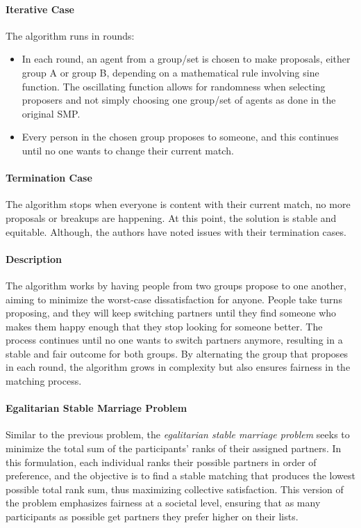 \paragraph{Iterative Case}
The algorithm runs in rounds:
\begin{itemize}
    \item In each round, an agent from a group/set is chosen to make proposals, either group A or group B, depending on a mathematical rule involving sine function. The oscillating function allows for randomness when selecting proposers and not simply choosing one group/set of agents as done in the original SMP.
    \item Every person in the chosen group proposes to someone, and this continues until no one wants to change their current match.
\end{itemize}

\paragraph{Termination Case}
The algorithm stops when everyone is content with their current match, no more proposals or breakups are happening. At this point, the solution is stable and equitable. Although, the authors have noted issues with their termination cases.

\paragraph{Description}
The algorithm works by having people from two groups propose to one another, aiming to minimize the worst-case dissatisfaction for anyone. People take turns proposing, and they will keep switching partners until they find someone who makes them happy enough that they stop looking for someone better. The process continues until no one wants to switch partners anymore, resulting in a stable and fair outcome for both groups. By alternating the group that proposes in each round, the algorithm grows in complexity but also ensures fairness in the matching process. 

\paragraph{Egalitarian Stable Marriage Problem}
Similar to the previous problem, the \emph{egalitarian stable marriage problem} seeks to minimize the total sum of the participants' ranks of their assigned partners. In this formulation, each individual ranks their possible partners in order of preference, and the objective is to find a stable matching that produces the lowest possible total rank sum, thus maximizing collective satisfaction. This version of the problem emphasizes fairness at a societal level, ensuring that as many participants as possible get partners they prefer higher on their lists.

